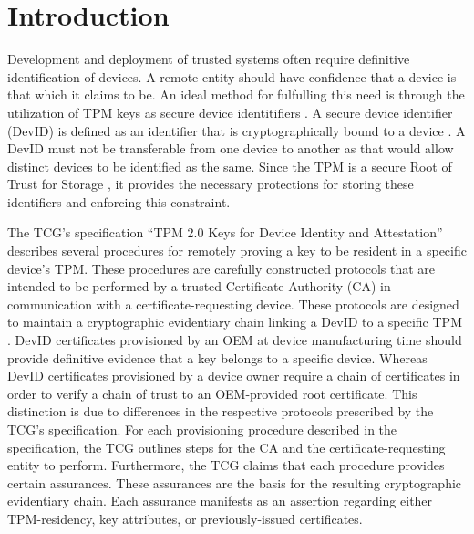 \chapter{Introduction}




Development and deployment of trusted systems often require definitive identification of devices. A remote entity should have confidence that a device is that which it claims to be. An ideal method for fulfulling this need is through the utilization of TPM keys as secure device identitifiers \cite{DevIDSpec-TCG}. A secure device identifier (DevID) is defined as an identifier that is cryptographically bound to a device \cite{DevIDSpec-IEEE}. 
A DevID must not be transferable from one device to another as that would allow distinct devices to be identified as the same. 
Since the TPM is a secure Root of Trust for Storage \cite{TPMSpec}, it provides the necessary protections for storing these identifiers and enforcing this constraint. 

The TCG's specification ``TPM 2.0 Keys for Device Identity and Attestation'' \cite{DevIDSpec-TCG} describes several procedures for remotely proving a key to be resident in a specific device's TPM. These procedures are carefully constructed protocols that are intended to be performed by a trusted Certificate Authority (CA) in communication with a certificate-requesting device. These protocols are designed to maintain a cryptographic evidentiary chain linking a DevID to a specific TPM \cite{DevIDSpec-TCG}. 
DevID certificates provisioned by an OEM at device manufacturing time should provide definitive evidence that a key belongs to a specific device. Whereas DevID certificates provisioned by a device owner require a chain of certificates in order to verify a chain of trust to an OEM-provided root certificate. This distinction is due to differences in the respective protocols prescribed by the TCG's specification. 
For each provisioning procedure described in the specification, the TCG outlines steps for the CA and the certificate-requesting entity to perform. Furthermore, the TCG claims that each procedure provides certain assurances. These assurances are the basis for the resulting cryptographic evidentiary chain.
Each assurance manifests as an assertion regarding either TPM-residency, key attributes, or previously-issued certificates.

